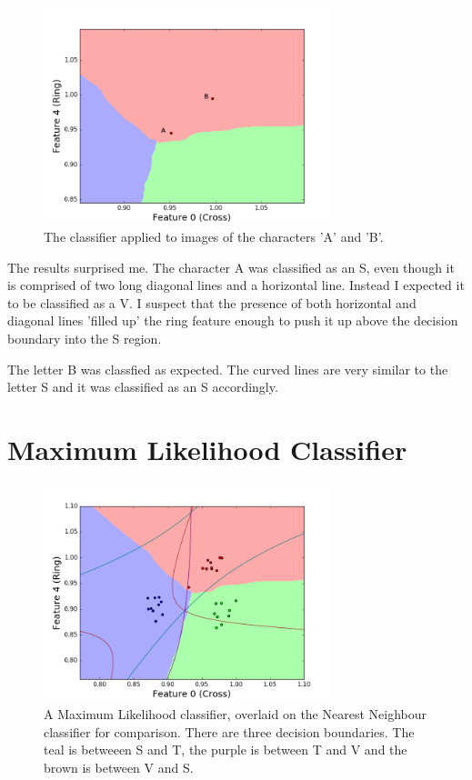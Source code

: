 \documentclass[11pt, a4paper]{article}
\begin{document}
\begin{figure}[h]
	\centering
	\includegraphics[trim={0 0 0 1cm},clip,width=0.75\textwidth]{ab.png}
	\caption{The classifier applied to images of the characters 'A' and 'B'.}
	\label{fig:ab}
\end{figure}

The results surprised me. The character A was classified as an S, even though it is comprised of two long diagonal lines and a horizontal line. Instead I expected it to be classified as a V. I suspect that the presence of both horizontal and diagonal lines 'filled up' the ring feature enough to push it up above the decision boundary into the S region. 

The letter B was classfied as expected. The curved lines are very similar to the letter S and it was classified as an S accordingly. 

\section{Maximum Likelihood Classifier}
\begin{figure}[ht]
	\centering
	\includegraphics[trim={0 0 0 1cm},clip,width=0.75\textwidth]{max_likelihood.png}
	\caption{A Maximum Likelihood classifier, overlaid on the Nearest Neighbour classifier for comparison. There are three decision boundaries. The teal is betweeen S and T, the purple is between T and V and the brown is between V and S.}
	\label{fig:ml}
\end{figure}
\end{document}
